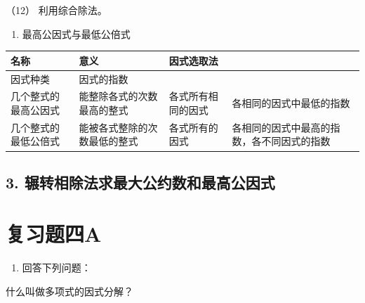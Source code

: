 （12） 利用综合除法。

\begin{enumerate}[start=2]
\item
  最高公因式与最低公倍式
\end{enumerate}

{\def\LTcaptype{none} %
\begin{longtable}[]{@{}
  >{\raggedright\arraybackslash}p{}
  >{\raggedright\arraybackslash}p{}
  >{\raggedright\arraybackslash}p{}
  >{\raggedright\arraybackslash}p{}@{}}
\toprule\noalign{}
\begin{minipage}[b]{\linewidth}\raggedright
名称
\end{minipage} & \begin{minipage}[b]{\linewidth}\raggedright
意义
\end{minipage} & \begin{minipage}[b]{\linewidth}\raggedright
因式选取法
\end{minipage} & \begin{minipage}[b]{\linewidth}\raggedright
\end{minipage} \\
\midrule\noalign{}
\endhead
\bottomrule\noalign{}
\endlastfoot
因式种类 & 因式的指数 & & \\
几个整式的最高公因式 & 能整除各式的次数最高的整式 & 各式所有相同的因式 &
各相同的因式中最低的指数 \\
几个整式的最低公倍式 & 能被各式整除的次数最低的整式 & 各式所有的因式 &
各相同的因式中最高的指数，各不同因式的指数 \\
\end{longtable}
}

\subsection{3. 辗转相除法求最大公约数和最高公因式}

\section{复习题四A}

\begin{enumerate}
\item
  回答下列问题：
\end{enumerate}

什么叫做多项式的因式分解？

